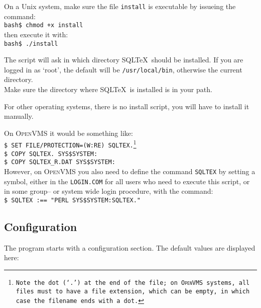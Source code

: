 \documentclass{article}
\newcommand{\vs}{\vspace{3mm}}
\begin{document}
\vs

On a Unix system, make sure the file \texttt{install} is executable by issueing
the command:\\
\texttt{bash\$ chmod +x install}\\
then execute it with:\\
\texttt{bash\$ ./install}

The script will ask in which directory SQL\TeX\ should be installed. If you are
logged in as `root', the default will be \texttt{/usr/local/bin}, otherwise the
current directory.\\
Make sure the directory where SQL\TeX\ is installed is in your path.

\vs

For other operating systems, there is no install script, you will have to install
it manually.

On \textsc{OpenVMS} it would be something like:\\
\texttt{\$ SET FILE/PROTECTION=(W:RE) SQLTEX.\footnote{Note the dot (`.') at the end of the file; on
\textsc{OpenVMS} systems, all files must to have a file extension, which can
be empty, in which case the filename ends with a dot.}\\
\$ COPY SQLTEX. SYS\$SYSTEM:\\
\$ COPY SQLTEX\_R.DAT SYS\$SYSTEM:}\\
However, on \textsc{OpenVMS} you also need to define the command \texttt{SQLTEX} by setting a symbol,
either in the \texttt{LOGIN.COM} for all users who need to execute this script, or in some group-- or
system wide login procedure, with the command:  \\
\texttt{\$ SQLTEX :== "PERL SYS\$SYSTEM:SQLTEX."} 

\subsection{Configuration}\label{config}

The program starts with a configuration section. The default values are displayed
here:

\vs
\end{document}
